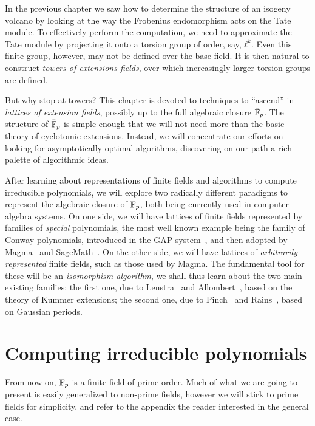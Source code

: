 \documentclass{report}
\theoremstyle{plain}
\theoremstyle{definition}
\begin{document}
In the previous chapter we saw how to determine the structure of an
isogeny volcano by looking at the way the Frobenius endomorphism acts
on the Tate module. %
To effectively perform the computation, we need to approximate the
Tate module by projecting it onto a torsion group of order, say,
$ℓ^k$. %
Even this finite group, however, may not be defined over the base
field. %
It is then natural to construct \emph{towers of extensions fields},
over which increasingly larger torsion groups are defined. %

But why stop at towers? %
This chapter is devoted to techniques to ``ascend'' in \emph{lattices
  of extension fields}, possibly up to the full algebraic closure
$\bar{\mathbb{F}}_p$. %
The structure of $\bar{\mathbb{F}}_p$ is simple enough that we will not need
more than the basic theory of cyclotomic extensions. %
Instead, we will concentrate our efforts on looking for asymptotically
optimal algorithms, discovering on our path a rich palette of
algorithmic ideas. %

After learning about representations of finite fields and algorithms
to compute irreducible polynomials, we will explore two radically
different paradigms to represent the algebraic closure of $\mathbb{F}_p$, both
being currently used in computer algebra systems. %
On one side, we will have lattices of finite fields represented by
families of \emph{special} polynomials, the most well known example
being the family of Conway polynomials, introduced in the GAP
system~\cite{GAP4}, and then adopted by Magma~\cite{MAGMA} and
SageMath~\cite{Sage}. %
On the other side, we will have lattices of \emph{arbitrarily
  represented} finite fields, such as those used by Magma. %
The fundamental tool for these will be an \emph{isomorphism
  algorithm}, we shall thus learn about the two main existing
families: the first one, due to Lenstra~\cite{LenstraJr91} and
Allombert~\cite{Allombert02}, based on the theory of Kummer
extensions; the second one, due to Pinch~\cite{Pinch} and
Rains~\cite{rains2008}, based on Gaussian periods. %



\section{Computing irreducible polynomials}

From now on, $\mathbb{F}_p$ is a finite field of prime order. %
Much of what we are going to present is easily generalized to
non-prime fields, however we will stick to prime fields for
simplicity, and refer to the appendix the reader interested in
the general case. %
\end{document}

